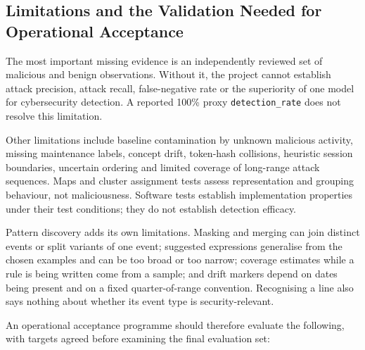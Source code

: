 \documentclass[11pt,a4paper]{article}
\begin{document}
\subsection{Limitations and the Validation Needed for Operational Acceptance}

The most important missing evidence is an independently reviewed set of malicious and benign observations. Without it, the project cannot establish attack precision, attack recall, false-negative rate or the superiority of one model for cybersecurity detection. A reported 100\% proxy \nolinkurl{detection_rate} does not resolve this limitation.

Other limitations include baseline contamination by unknown malicious activity, missing maintenance labels, concept drift, token-hash collisions, heuristic session boundaries, uncertain ordering and limited coverage of long-range attack sequences. Maps and cluster assignment tests assess representation and grouping behaviour, not maliciousness. Software tests establish implementation properties under their test conditions; they do not establish detection efficacy.

Pattern discovery adds its own limitations. Masking and merging can join distinct events or split variants of one event; suggested expressions generalise from the chosen examples and can be too broad or too narrow; coverage estimates while a rule is being written come from a sample; and drift markers depend on dates being present and on a fixed quarter-of-range convention. Recognising a line also says nothing about whether its event type is security-relevant.

An operational acceptance programme should therefore evaluate the following, with targets agreed before examining the final evaluation set:
\end{document}

